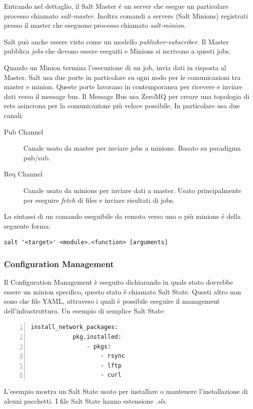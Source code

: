 Entrando nel dettaglio, il Salt Master é un server che esegue un particolare processo chiamato \textit{salt-master}.  Inoltra comandi a  servers (Salt Minions) registrati presso il master che eseguono processo chiamato \textit{salt-minion}.

Salt può anche essere visto come un modello \textit{publisher-subscriber}. Il Master pubblica \textit{jobs} che devono essere eseguiti e Minions si iscrivono a questi jobs.

Quando un Minion termina l'esecuzione di un job, invia dati in risposta al Master. Salt usa due porte in particolare su ogni nodo per le comunicazioni tra master e minion.  Queste porte lavorano in contemporanea per ricevere e inviare dati verso il message bus.
Il Message Bus usa ZeroMQ per creare una topologia di rete asincrona per la comunicazione più veloce possibile.
In particolare usa due canali:
\begin{description}
    \item [Pub Channel] Canale usato da master per inviare jobs a minions. Basato su paradigma pub/sub.
    \item [Req Channel] Canale usato da minions per inviare dati a master. Usato principalmente per eseguire \textit{fetch} di files e inviare risultati di jobs.
\end{description}


La sintassi di un comando eseguibile da remoto verso uno  o più minions é della seguente forma:

\begin{center}
\begin{BVerbatim}
salt '<target>' <module>.<function> [arguments]
\end{BVerbatim}
\end{center}
\subsubsection{Configuration Management}
Il Configuration Management è eseguito dichiarando in quale stato dovrebbe essere un minion specifico, questo stato è chiamato Salt State. Questi altro non sono che file YAML, attraveso i quali è possibile eseguire il management dell'infrastruttura.
Un esempio di semplice Salt State:
    \begin{Verbatim}[numbers=left,frame=single,fontsize=\small]
        install_network_packages:
            pkg.installed:
                - pkgs:
                    - rsync
                    - lftp
                    - curl
    \end{Verbatim}
L'esempio  mostra un Salt State usato per installare o mantenere l'installazione di alcuni pacchetti. I file Salt State hanno estensione \textit{.sls}.


